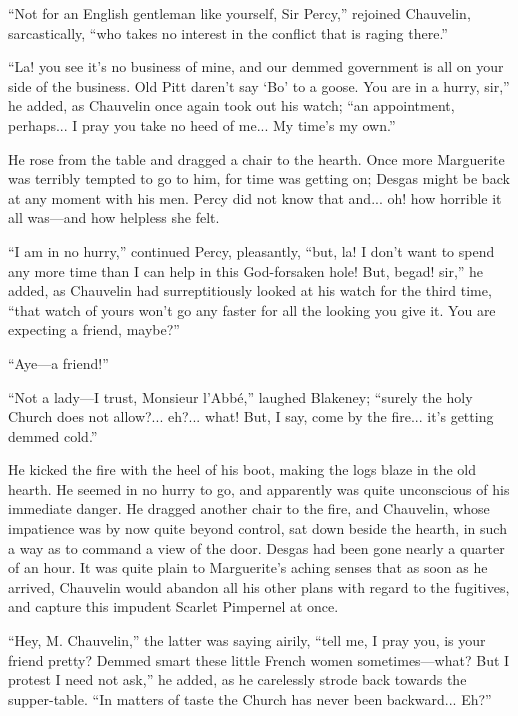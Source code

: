 \documentclass[paper=5.5in:8.5in,BCOR=7mm,twoside,DIV=calc,12pt,usegeometry,chapterprefix,endperiod,headings=big]{scrbook}
\begin{document}
\enquote{Not for an English gentleman like yourself, Sir Percy,} rejoined Chauvelin, sarcastically, \enquote{who takes no interest in the conflict that is raging there.}

\enquote{La! you see it's no business of mine, and our demmed government is all on your side of the business. Old Pitt daren't say \enquote{Bo} to a goose. You are in a hurry, sir,} he added, as Chauvelin once again took out his watch; \enquote{an appointment, perhaps... I pray you take no heed of me... My time's my own.}

He rose from the table and dragged a chair to the hearth. Once more Marguerite was terribly tempted to go to him, for time was getting on; Desgas might be back at any moment with his men. Percy did not know that and... oh! how horrible it all was---and how helpless she felt.

\enquote{I am in no hurry,} continued Percy, pleasantly, \enquote{but, la! I don't want to spend any more time than I can help in this God-forsaken hole! But, begad! sir,} he added, as Chauvelin had surreptitiously looked at his watch for the third time, \enquote{that watch of yours won't go any faster for all the looking you give it. You are expecting a friend, maybe?}

\enquote{Aye---a friend!}

\enquote{Not a lady---I trust, Monsieur l'Abbé,} laughed Blakeney; \enquote{surely the holy Church does not allow?... eh?... what! But, I say, come by the fire... it's getting demmed cold.}

He kicked the fire with the heel of his boot, making the logs blaze in the old hearth. He seemed in no hurry to go, and apparently was quite unconscious of his immediate danger. He dragged another chair to the fire, and Chauvelin, whose impatience was by now quite beyond control, sat down beside the hearth, in such a way as to command a view of the door. Desgas had been gone nearly a quarter of an hour. It was quite plain to Marguerite's aching senses that as soon as he arrived, Chauvelin would abandon all his other plans with regard to the fugitives, and capture this impudent Scarlet Pimpernel at once.

\enquote{Hey, M. Chauvelin,} the latter was saying airily, \enquote{tell me, I pray you, is your friend pretty? Demmed smart these little French women sometimes---what? But I protest I need not ask,} he added, as he carelessly strode back towards the supper-table. \enquote{In matters of taste the Church has never been backward... Eh?}
\end{document}
